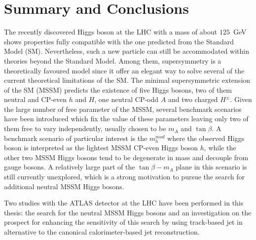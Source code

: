\chapter{Summary and Conclusions}
The recently discovered Higgs boson at the LHC 
with a mass of about $125$~GeV shows properties fully compatible with the one predicted from the Standard Model (SM).
Nevertheless, such a new particle can still be accommodated within theories beyond the
Standard Model. Among  them, supersymmetry is a theoretically favoured model 
since it offer an elegant way to solve several of the current theoretical limitations of the SM.
The minimal supersymmetric extension of the SM (MSSM) predicts the existence
of five Higgs bosons, two of them neutral and CP-even $h$ and $H$, one neutral CP-odd $A$ and two charged $H^{\pm}$.
Given the large number of free parameter of the MSSM, several benchmark scenarios have been introduced 
which  fix the value of these parameters leaving only two of them free to vary independently, usually chosen to be $m_A$ and $\tan\beta$.
A benchmark scenario of particular interest is the $m_h^{mod}$ where the observed Higgs boson is interpreted as 
the lightest MSSM CP-even Higgs boson $h$, while the other two MSSM Higgs bosons tend to be degenerate in mass
and decouple from gauge bosons. A relatively large part of the $\tan\beta -m_A$ plane in this scenario is still currently 
unexplored, which is a strong motivation to pursue the search for additional neutral MSSM Higgs bosons.

Two studies with the ATLAS detector at the LHC have been performed in this thesis: the search for the neutral MSSM Higgs bosons
and an investigation on the prospect for enhancing the sensitivity of this search by using track-based jet
in alternative to the canonical calorimeter-based jet reconstruction.

